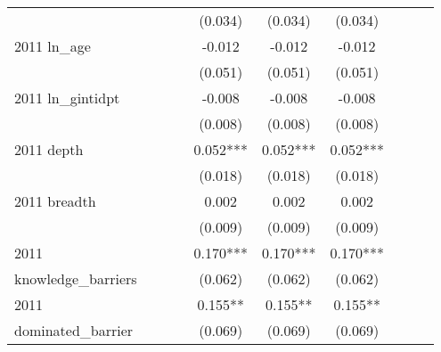\begin{table}[htbp]
\begin{tabular}{l*{9}{c}}
                    &               &               &               &     (0.034)   &     (0.034)   &     (0.034)   &               &               &               \\
2011 ln\_age         &               &               &               &      -0.012   &      -0.012   &      -0.012   &               &               &               \\
                    &               &               &               &     (0.051)   &     (0.051)   &     (0.051)   &               &               &               \\
2011 ln\_gintidpt    &               &               &               &      -0.008   &      -0.008   &      -0.008   &               &               &               \\
                    &               &               &               &     (0.008)   &     (0.008)   &     (0.008)   &               &               &               \\
2011 depth          &               &               &               &       0.052***&       0.052***&       0.052***&               &               &               \\
                    &               &               &               &     (0.018)   &     (0.018)   &     (0.018)   &               &               &               \\
2011 breadth        &               &               &               &       0.002   &       0.002   &       0.002   &               &               &               \\
                    &               &               &               &     (0.009)   &     (0.009)   &     (0.009)   &               &               &               \\
2011                &               &               &               &       0.170***&       0.170***&       0.170***&               &               &               \\
knowledge\_barriers  &               &               &               &     (0.062)   &     (0.062)   &     (0.062)   &               &               &               \\
2011                &               &               &               &       0.155** &       0.155** &       0.155** &               &               &               \\
dominated\_barrier   &               &               &               &     (0.069)   &     (0.069)   &     (0.069)   &               &               &               \\

\end{tabular}
\end{table}

